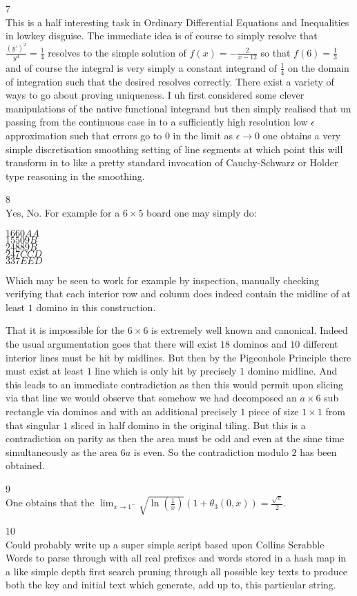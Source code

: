 7 \\
This is a half interesting task in Ordinary Differential Equations and Inequalities in lowkey disguise. The immediate idea is of course to simply resolve that $\frac{(y')^2}{y^4} = \frac{1}{4}$ resolves to the simple solution of $f(x) = -\frac{2}{x-12}$ so that $f(6) = \boxed{\frac{1}{3}}$ and of course the integral is very simply a constant integrand of $\frac{1}{4}$ on the domain of integration such that the desired resolves correctly. There exist a variety of ways to go about proving uniqueness. I uh first considered some clever manipulations of the native functional integrand but then simply realised that un passing from the continuous case in to a sufficiently high resolution low $\epsilon$ approximation such that errors go to $0$ in the limit as $\epsilon \to 0$ one obtains a very simple discretisation smoothing setting of line segments at which point this will transform in to like a pretty standard invocation of Cauchy-Schwarz or Holder type reasoning in the smoothing.

8 \\
$\boxed{\text{Yes, No}}$. For example for a $6 \times 5$ board one may simply do:

$1660AA$ \\
$15509B$ \\
$24889B$ \\
$247CCD$ \\
$337EED$

Which may be seen to work for example by inspection, manually checking verifying that each interior row and column does indeed contain the midline of at least $1$ domino in this construction.

That it is impossible for the $6 \times 6$ is extremely well known and canonical. Indeed the usual argumentation goes that there will exist $18$ dominos and $10$ different interior lines must be hit by midlines. But then by the Pigeonhole Principle there must exist at least $1$ line which is only hit by precisely $1$ domino midline. And this leads to an immediate contradiction as then this would permit upon slicing via that line we would observe that somehow we had decomposed an $a \times 6$ sub rectangle via dominos and with an additional precisely $1$ piece of size $1 \times 1$ from that singular $1$ sliced in half domino in the original tiling. But this is a contradiction on parity as then the area must be odd and even at the sime time simultaneously as the area $6a$ is even. So the contradiction modulo $2$ has been obtained.

9 \\
One obtains that the $\lim_{x \to 1^{-}} \sqrt{\ln \left( \frac{1}{x} \right)} (1 + \theta_3 (0,x)) = \boxed{\frac{\sqrt{\pi}}{2}}$.

10 \\
Could probably write up a super simple script based upon Collins Scrabble Words to parse through with all real prefixes and words stored in a hash map in a like simple depth first search pruning through all possible key texts to produce both the key and initial text which generate, add up to, this particular string.